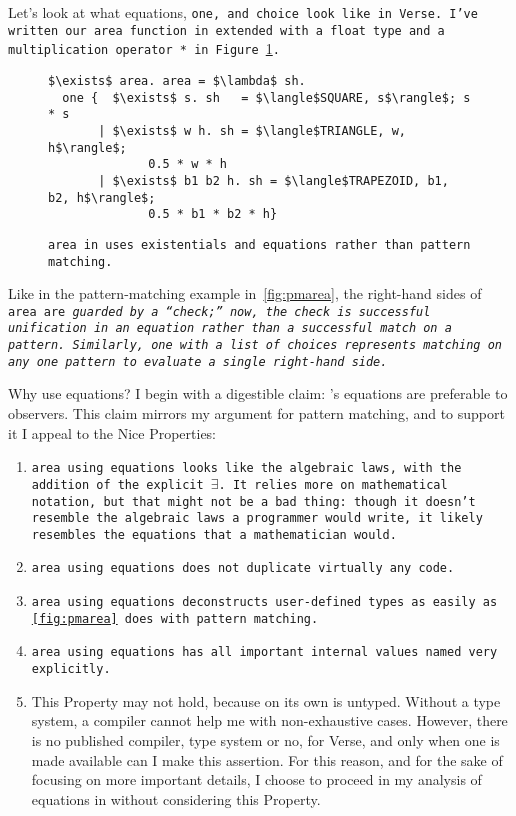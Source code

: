 \documentclass[manuscript,screen,review, 12pt, nonacm]{acmart}
\begin{document}
    Let's look at what equations, \tt{one}, and choice look like in Verse. I've
    written our \tt{area} function in \VC extended with a \tt{float} type and a
    multiplication operator \tt{*} in Figure~\ref{fig:versearea}. 

    \begin{figure}[]
        \verselst
        \begin{lstlisting}[numbers=none]
$\exists$ area. area = $\lambda$ sh. 
  one {  $\exists$ s. sh   = $\langle$SQUARE, s$\rangle$; s * s
       | $\exists$ w h. sh = $\langle$TRIANGLE, w, h$\rangle$; 
              0.5 * w * h
       | $\exists$ b1 b2 h. sh = $\langle$TRAPEZOID, b1, b2, h$\rangle$; 
              0.5 * b1 * b2 * h}
        \end{lstlisting}
    \caption{\tt{area} in \VC uses existentials and equations rather than
    pattern matching.} 
    \label{fig:versearea}
    \end{figure}

    Like in the pattern-matching example in~\ref{fig:pmarea}, the right-hand
    sides of \tt{area} are \it{guarded} by a “check;” now, the check is
    successful unification in an equation rather than a successful match on a
    pattern. Similarly, \tt{one} with a list of choices represents matching on
    any \it{one} pattern to evaluate a single right-hand side. 

    Why use equations? I begin with a digestible claim: \VC's equations are
    preferable to observers. This claim mirrors my argument for pattern
    matching, and to support it I appeal to the Nice Properties: 

    \begin{enumerate}
      \item \tt{area} using equations looks like the algebraic laws, with the
      addition of the explicit $\exists$. It relies more on mathematical
      notation, but that might not be a bad thing: though it doesn't resemble
      the algebraic laws a programmer would write, it likely resembles the
      equations that a mathematician would. 
      \item \tt{area} using equations does not duplicate virtually any code. 
      \item \tt{area} using equations deconstructs user-defined types as easily
      as \ref{fig:pmarea} does with pattern matching. 
      \item \tt{area} using equations has all important internal values named
      very explicitly.
      \item This Property may not hold, because \VC on its own is untyped.
      Without a type system, a compiler cannot help me with non-exhaustive
      cases. However, there is no published compiler, type system or no, for
      Verse, and only when one is made available can I make this assertion. For
      this reason, and for the sake of focusing on more important details, I
      choose to proceed in my analysis of equations in \VC without considering
      this Property. 
    \end{enumerate}
\end{document}

